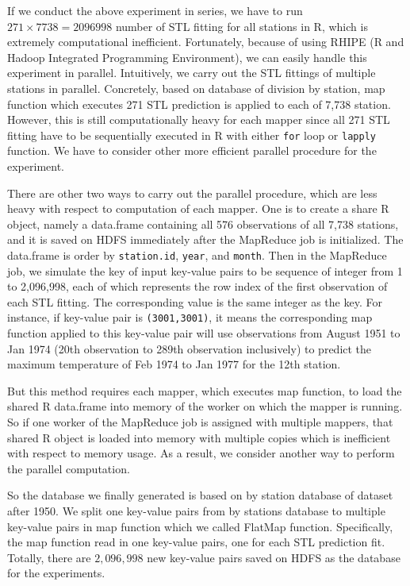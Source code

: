 If we conduct the above experiment in series, we have to run 
$271 \times 7738 = 2096998$ number of STL fitting for all stations in R, which is 
extremely computational inefficient. Fortunately, because of using RHIPE
(R and Hadoop Integrated Programming Environment), we can easily handle this 
experiment in parallel. Intuitively, we carry out the STL fittings of multiple 
stations in parallel. Concretely, based on database of division by station, map
function which executes 271 STL prediction is applied to each of 7,738 station.
However, this is still computationally heavy for each mapper since all 271 STL 
fitting have to be sequentially executed in R with either \texttt{for} loop or 
\texttt{lapply} function. We have to consider other more efficient parallel 
procedure for the experiment.

There are other two ways to carry out the parallel procedure, which are less 
heavy with respect to computation of each mapper. One is to create a share
R object, namely a data.frame containing all 576 observations of all 7,738 
stations, and it is saved on HDFS immediately after the MapReduce job is 
initialized. The data.frame is order by \texttt{station.id}, \texttt{year}, and
\texttt{month}. Then in the MapReduce job, we simulate the key of input key-value
pairs to be sequence of integer from 1 to 2,096,998, each of which represents the
row index of the first observation of each STL fitting. The corresponding value 
is the same integer as the key. For instance, if key-value pair is 
\texttt{(3001,3001)}, it means the corresponding map function applied to this 
key-value pair will use observations from August 1951 to Jan 1974 (20th observation
to 289th observation inclusively) to predict the maximum temperature of Feb 1974
to Jan 1977 for the 12th station.

But this method requires each mapper, which executes map function, to load the
shared R data.frame into memory of the worker on which the mapper is running. So
if one worker of the MapReduce job is assigned with multiple mappers, that shared
R object is loaded into memory with multiple copies which is inefficient with
respect to memory usage. As a result, we consider another way to perform the 
parallel computation. 

So the database we finally generated is based on 
by station database of dataset after 1950. We split one key-value pairs from by 
stations database to multiple key-value pairs in map function which we called 
FlatMap function. Specifically, the map function read in one key-value pairs, one
for each STL prediction fit. Totally, there are $2,096,998$ new key-value pairs 
saved on HDFS as the database for the experiments.

